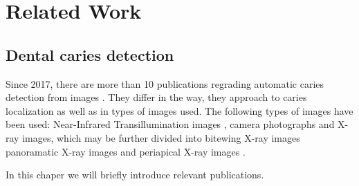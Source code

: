 \chapter{Related Work}

\section{Dental caries detection}
Since 2017, there are more than 10 publications regrading automatic caries detection from images \cite{PradosPrivado2020}. They differ in the way, they approach to caries localization as well as in types of images used. The following types of images have been used: Near-Infrared Transillumination images \cite{Casalegno2019,Schwendicke2020}, camera photographs \cite{Moutselos2019} and X-ray images, which may be further divided into bitewing X-ray images \cite{Moran2021, Cantu2020, Bayrakdar2021, Mao2021, Srivastava2017} panoramatic X-ray images \cite{Lian2021} and periapical X-ray images \cite{Lee2018}.

In this chaper we will briefly introduce relevant publications.





